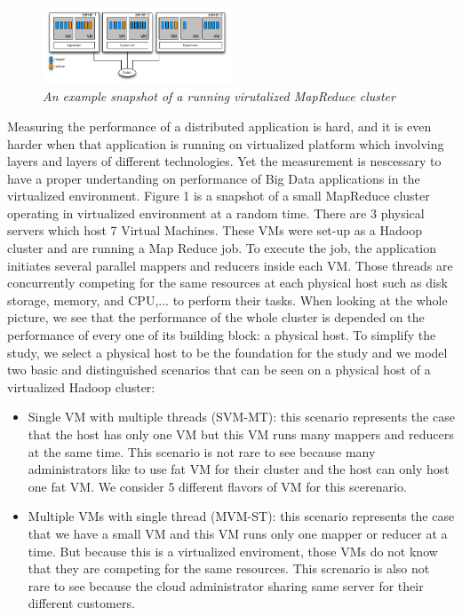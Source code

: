 \documentclass{acmsig}
\begin{document}
\begin{figure}[htbp]
    \centering
    \includegraphics[width=0.5\textwidth]{figures/cluster_snapshot.png}
    \caption{\textit{An example snapshot of a running virutalized MapReduce cluster}}
    \label{cluster_snapshot}
\end{figure}

Measuring the performance of a distributed application is hard, and it is even harder when that application is running on virtualized platform which involving layers and layers of different technologies. Yet the measurement is nescessary to have a proper undertanding on performance of Big Data applications in the virtualized environment. Figure 1 is a snapshot of a small MapReduce cluster operating in virtualized environment at a random time. There are 3 physical servers which host 7 Virtual Machines. These VMs were set-up as a Hadoop cluster and are running a Map Reduce job. To execute the job, the application initiates several parallel mappers and reducers inside each VM. Those threads are concurrently competing for the same resources at each physical host such as disk storage, memory, and CPU,... to perform their tasks. When looking at the whole picture, we see that the performance of the whole cluster is depended on the performance of every one of its building block: a physical host. To simplify the study, we select a physical host to be the foundation for the study and we model two basic and distinguished scenarios that can be seen on a physical host of a virtualized Hadoop cluster:
\begin{itemize} 
\item Single VM with multiple threads (SVM-MT): this scenario represents the case that the host has only one VM but this VM runs many mappers and reducers at the same time. This scenario is not rare to see because many administrators like to use fat VM for their cluster and the host can only host one fat VM. We consider 5 different flavors of VM for this scerenario.
\item Multiple VMs with single thread (MVM-ST): this scenario represents the case that we have a small VM and this VM runs only one mapper or reducer at a time. But because this is a virtualized enviroment, those VMs do not know that they are competing for the same resources. This screnario is also not rare to see because the cloud administrator sharing same server for their different customers.
\end{itemize}
\end{document}
